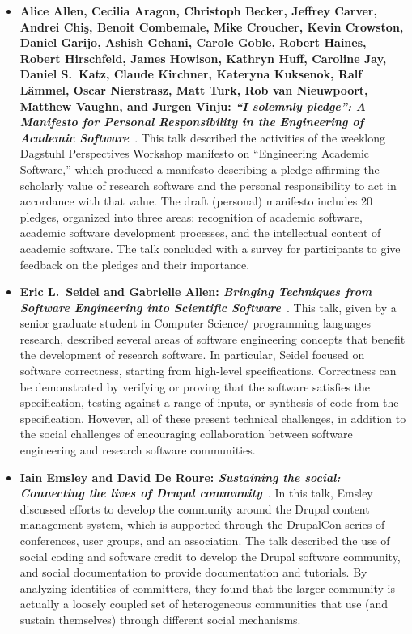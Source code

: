 \documentclass[11pt, oneside]{amsart}
\begin{document}
\begin{itemize}[itemsep=1ex]
    \item \textbf{Alice Allen, Cecilia Aragon, Christoph Becker, Jeffrey Carver,
    Andrei Chi\c{s}, Benoit Combemale, Mike Croucher, Kevin Crowston, Daniel Garijo,
    Ashish Gehani, Carole Goble\textsuperscript{\textasteriskcentered},
    Robert Haines, Robert Hirschfeld, James Howison,
    Kathryn Huff, Caroline Jay, Daniel S.~Katz, Claude Kirchner, Kateryna Kuksenok,
    Ralf L\"{a}mmel, Oscar Nierstrasz, Matt Turk, Rob van Nieuwpoort, Matthew Vaughn,
    and Jurgen Vinju: \emph{``I solemnly pledge'': A Manifesto for Personal
    Responsibility in the Engineering of Academic Software}}~\cite{AAllen:2016ws}.
    This talk described the activities of the weeklong Dagstuhl Perspectives Workshop
    manifesto on ``Engineering Academic Software,'' which produced a manifesto
    describing a pledge affirming the scholarly value of research software and
    the personal responsibility to act in accordance with that value. The draft
    (personal) manifesto includes 20 pledges, organized into three areas:
    recognition of academic software, academic software development processes,
    and the intellectual content of academic software. The talk concluded with a
    survey for participants to give feedback on the pledges and their importance.

    \item \textbf{Eric L.~Seidel\textsuperscript{\textasteriskcentered}
    and Gabrielle Allen: \textit{Bringing Techniques from Software Engineering
    into Scientific Software}}~\cite{Seidel:2016ws}.
    This talk, given by a senior graduate student in Computer Science\slash
    programming languages research, described several areas of software engineering
    concepts that benefit the development of research software. In particular,
    Seidel focused on software correctness, starting from high-level
    specifications. Correctness can be demonstrated by verifying or proving
    that the software satisfies the specification, testing against a range of
    inputs, or synthesis of code from the specification. However, all of these
    present technical challenges, in addition to the social challenges of
    encouraging collaboration between software engineering and research software
    communities.

    \item \textbf{Iain Emsley\textsuperscript{\textasteriskcentered} and David
    De Roure: \textit{Sustaining the social: Connecting the lives of Drupal
    community}}~\cite{Emsley:2016ws}.
    In this talk, Emsley discussed efforts to develop the community around the
    Drupal content management system, which is supported through the DrupalCon
    series of conferences, user groups, and an association.
    The talk described the use of social coding and software credit to develop
    the Drupal software community, and social documentation to provide
    documentation and tutorials. By analyzing identities of committers, they
    found that the larger community is actually a loosely coupled set of
    heterogeneous communities that use (and sustain themselves) through different
    social mechanisms.


\end{itemize}
\end{document}
